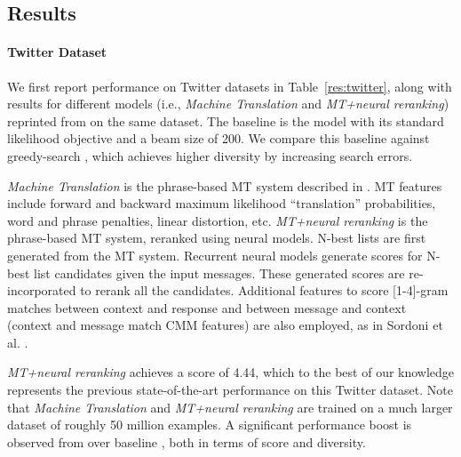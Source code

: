 \subsection{Results}

\paragraph{Twitter Dataset} We first report performance on Twitter datasets in Table~\ref{res:twitter}, along with results
for different models (i.e., {\it Machine Translation} and {\it MT+neural reranking})
reprinted from  on the same dataset. The baseline is the \sts model with its standard likelihood objective and a beam size of 200. We compare this baseline against greedy-search \sts \cite{vinyals2015neural}, which achieves higher diversity by increasing search errors.
 
{\it Machine Translation} is the phrase-based MT system described in  
. MT features include 
forward and backward maximum
likelihood ``translation'' probabilities, word and
phrase penalties, linear distortion, etc. 
{\it MT+neural reranking} is the phrase-based MT system, reranked using neural models.  
N-best lists are first generated from the MT system.
Recurrent neural models generate scores for N-best list candidates given the input messages.
These generated scores are re-incorporated to rerank all the candidates. 
Additional features to score [1-4]-gram matches between context and response and between message and context (context and message match CMM features) are also employed, as in Sordoni et al. .  

{\it MT+neural reranking} achieves a \bleu score of 4.44, which to the best of our knowledge represents the previous state-of-the-art performance on this Twitter dataset.  Note that  
{\it Machine Translation}  and {\it MT+neural reranking}  are trained on a much larger dataset of roughly 50 million examples.
A significant performance boost is observed from \mmiBD over baseline \sts, both in terms of \bleu score and diversity.  


